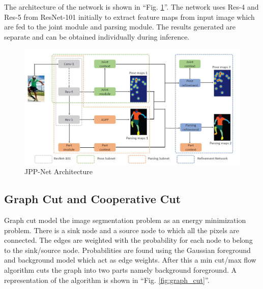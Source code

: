\documentclass[conference]{IEEEtran}
\begin{document}
The architecture of the network is shown in ``Fig. \ref{fig:JPP_arch}''. The network uses Res-4 and Res-5 from ResNet-101 initially to extract feature maps from input image which are fed to the joint module and parsing module. The results generated are separate and can be obtained individually during inference.
\begin{figure}[htbp]
\centerline{\includegraphics[width=\linewidth]{jpp_net}}
\caption{JPP-Net Architecture}
\label{fig:JPP_arch}
\end{figure}

\subsection{Graph Cut and Cooperative Cut} \label{gc}
Graph cut model the image segmentation problem as an energy minimization problem. There is a sink node and a source node to which all the pixels are connected. The edges are weighted with the probability for each node to belong to the sink/source node. Probabilities are found using the Gaussian foreground and background model which act as edge weights. After this a min cut/max flow algorithm cuts the graph into two parts namely background foreground. A representation of the algorithm is shown in ``Fig. \ref{fig:graph_cut}''. 
\end{document}
